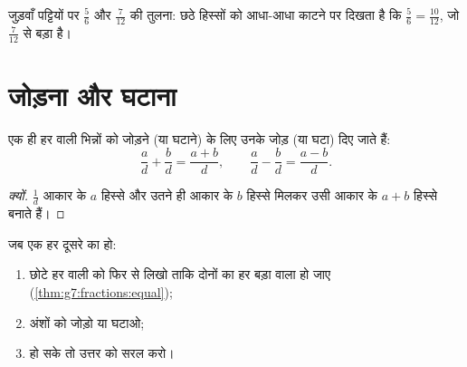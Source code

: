 \begin{omfigure}

{\small जुड़वाँ पट्टियों पर $\frac56$ और $\frac{7}{12}$ की तुलना:
छठे हिस्सों को आधा-आधा काटने पर दिखता है कि $\frac56 = \frac{10}{12}$,
जो $\frac{7}{12}$ से बड़ा है।}
\end{omfigure}

\section{जोड़ना और घटाना}

\begin{theorem}[एक ही हर]\label{thm:g7:fractions:add}
एक ही हर वाली भिन्नों को जोड़ने (या घटाने) के लिए उनके  जोड़
(या घटा) दिए जाते हैं:
\[
\frac{a}{d} + \frac{b}{d} = \frac{a + b}{d},
\qquad
\frac{a}{d} - \frac{b}{d} = \frac{a - b}{d} .
\]
\end{theorem}

\begin{proof}[क्यों]
$\frac1d$ आकार के $a$ हिस्से और उतने ही आकार के $b$ हिस्से मिलकर
उसी आकार के $a + b$ हिस्से बनाते हैं।
\end{proof}

\begin{method}\label{met:g7:fractions:add}
जब एक हर दूसरे का  हो:
\begin{enumerate}
  \item छोटे हर वाली  को फिर से लिखो ताकि दोनों का हर बड़ा
        वाला हो जाए (\cref{thm:g7:fractions:equal});
  \item अंशों को जोड़ो या घटाओ;
  \item हो सके तो उत्तर को सरल करो।
\end{enumerate}
\end{method}

